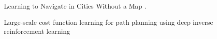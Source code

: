 \documentclass[UTF8]{ctexart}
\begin{document}
Learning to Navigate in Cities Without a Map \cite{mirowski2018learning}. %

Large-scale cost function learning for path planning using deep inverse reinforcement learning \cite{doi:10.1177/0278364917722396}

\cite{Kretzschmar:2016:SCM:3014315.3014318}

\cite{7955160}

\end{document}

